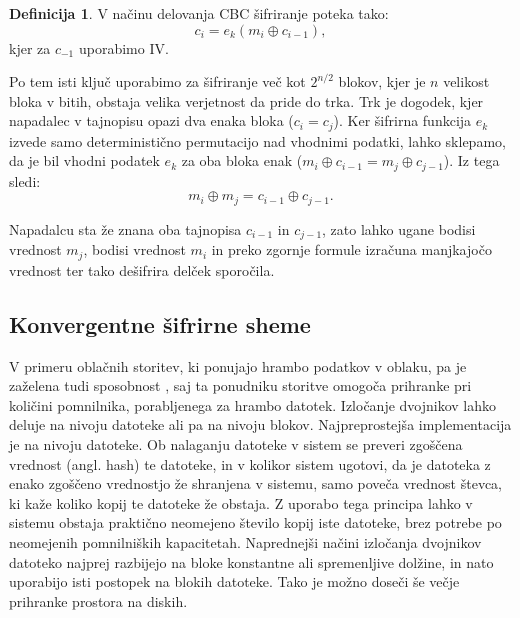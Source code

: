 \documentclass[12pt,a4paper,openany,tikz]{book}
\theoremstyle{plain}
\theoremstyle{definition}
\newtheorem{defn}[thm]{Definicija} %
\begin{document}
\begin{mdframed}[frametitle={Rojstnodnevni napad na način delovanja CBC}]
\begin{minipage}{\textwidth}
  \begin{defn}
    V načinu delovanja CBC šifriranje poteka tako: $$c_i = e_k(m_i \oplus c_{i-1}),$$ kjer za $c_{-1}$ uporabimo \gls{IV}.

    Po tem isti ključ uporabimo za šifriranje več kot $2^{n/2}$ blokov, kjer je $n$ velikost bloka v bitih, obstaja velika verjetnost da pride do trka. Trk je dogodek, kjer napadalec v tajnopisu opazi dva enaka bloka ($c_i = c_j$). Ker šifrirna funkcija $e_k$ izvede samo deterministično permutacijo nad vhodnimi podatki, lahko sklepamo, da je bil vhodni podatek $e_k$ za oba bloka enak ($m_i \oplus c_{i-1} = m_j \oplus c_{j-1}$). Iz tega sledi: $$m_i \oplus m_j = c_{i-1} \oplus c_{j-1}.$$

    Napadalcu sta že znana oba tajnopisa $c_{i-1}$ in $c_{j-1}$, zato lahko ugane bodisi vrednost $m_j$, bodisi vrednost $m_i$ in preko zgornje formule izračuna manjkajočo vrednost ter tako dešifrira delček sporočila.
    \label{def:bdayattack}
  \end{defn}
\end{minipage}
\end{mdframed}


\subsection*{Konvergentne šifrirne sheme}
\label{sub:Konvergentne šifrirne sheme}

V primeru oblačnih storitev, ki ponujajo hrambo podatkov v oblaku, pa je zaželena tudi sposobnost , saj ta ponudniku storitve omogoča prihranke pri količini pomnilnika, porabljenega za hrambo datotek. Izločanje dvojnikov lahko deluje na nivoju datoteke ali pa na nivoju blokov. Najpreprostejša implementacija je na nivoju datoteke. Ob nalaganju datoteke v sistem se preveri zgoščena vrednost (angl. hash) te datoteke, in v kolikor sistem ugotovi, da je datoteka z enako zgoščeno vrednostjo že shranjena v sistemu, samo poveča vrednost števca, ki kaže koliko kopij te datoteke že obstaja. Z uporabo tega principa lahko v sistemu obstaja praktično neomejeno število kopij iste datoteke, brez potrebe po neomejenih pomnilniških kapacitetah. Naprednejši načini izločanja dvojnikov datoteko najprej razbijejo na bloke konstantne ali spremenljive dolžine, in nato uporabijo isti postopek na blokih datoteke. Tako je možno doseči še večje prihranke prostora na diskih.
\end{document}
